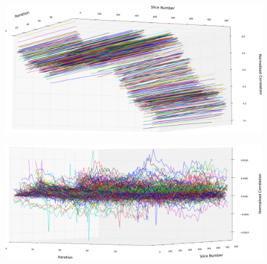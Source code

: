       \begin{figure}
        \centering
        \includegraphics[width=\textheight]{Ch6/Figs/diagnostics/affine_metric_values}
        \caption{}
        \label{fig:affine_metric_values}
      \end{figure}
      
      \begin{figure}
        \centering
        \includegraphics[width=\textheight]{Ch6/Figs/diagnostics/affine_metric_value_differences}
        \caption{}
        \label{fig:affine_metric_value_differences}
      \end{figure}
      
